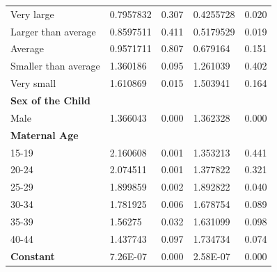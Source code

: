 \begin{frame}
\begin{table}[]
\begin{tabular}{lllll}
				Very large                          & 0.7957832             & 0.307                     & 0.4255728                & 0.020                     \\
				Larger than average                 & 0.8597511             & 0.411                     & 0.5179529                & 0.019                     \\
				Average                             & 0.9571711             & 0.807                     & 0.679164                 & 0.151                     \\
				Smaller than average                & 1.360186              & 0.095                     & 1.261039                 & 0.402                     \\
				Very small                          & 1.610869              & 0.015                     & 1.503941                 & 0.164                     \\
				\textbf{Sex of the Child}           &                       &                           &                          &                           \\
				Male                                & 1.366043              & 0.000                     & 1.362328                 & 0.000                     \\
				\textbf{Maternal Age}               &                       &                           &                          &                           \\
				15-19                               & 2.160608              & 0.001                     & 1.353213                 & 0.441                     \\
				20-24                               & 2.074511              & 0.001                     & 1.377822                 & 0.321                     \\
				25-29                               & 1.899859              & 0.002                     & 1.892822                 & 0.040                     \\
				30-34                               & 1.781925              & 0.006                     & 1.678754                 & 0.089                     \\
				35-39                               & 1.56275               & 0.032                     & 1.631099                 & 0.098                     \\
				40-44                               & 1.437743              & 0.097                     & 1.734734                 & 0.074                     \\
				\textbf{Constant}                   & 7.26E-07              & 0.000                     & 2.58E-07                 & 0.000                    
			\end{tabular}
		\end{table}
	\end{frame}
